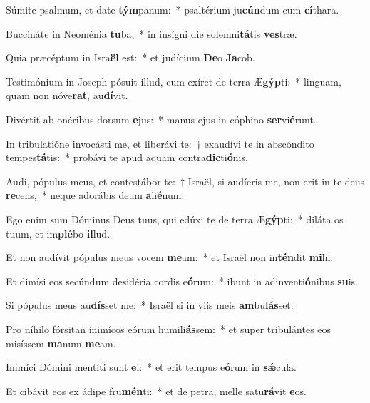 \item Súmite psalmum, et date \textbf{tým}panum:~* psaltérium ju\textbf{cún}dum cum \textbf{cí}thara.
\item Buccináte in Neoménia \textbf{tu}ba,~* in insígni die solemni\textbf{tá}tis \textbf{ves}træ.
\item Quia præcéptum in Isra\textbf{ël} est:~* et judícium \textbf{De}o \textbf{Ja}cob.
\item Testimónium in Joseph pósuit illud, cum exíret de terra Æ\textbf{gýp}ti:~* linguam, quam non nóve\textbf{rat}, au\textbf{dí}vit.
\item Divértit ab onéribus dorsum \textbf{e}jus:~* manus ejus in cóphino \textbf{ser}vi\textbf{é}runt.
\item In tribulatióne invocásti me, et liberávi te:~† exaudívi te in abscóndito tempes\textbf{tá}tis:~* probávi te apud aquam contra\textbf{dic}ti\textbf{ó}nis.
\item Audi, pópulus meus, et contestábor te:~† Israël, si audíeris me, non erit in te deus \textbf{re}cens,~* neque adorábis deum \textbf{a}li\textbf{é}num.
\item Ego enim sum Dóminus Deus tuus, qui edúxi te de terra Æ\textbf{gýp}ti:~* diláta os tuum, et im\textbf{plé}bo \textbf{il}lud.
\item Et non audívit pópulus meus vocem \textbf{me}am:~* et Israël non in\textbf{tén}dit \textbf{mi}hi.
\item Et dimísi eos secúndum desidéria cordis e\textbf{ó}rum:~* ibunt in adinventi\textbf{ó}nibus \textbf{su}is.
\item Si pópulus meus au\textbf{dís}set me:~* Israël si in viis meis \textbf{am}bu\textbf{lás}set:
\item Pro níhilo fórsitan inimícos eórum humili\textbf{ás}sem:~* et super tribulántes eos misíssem \textbf{ma}num \textbf{me}am.
\item Inimíci Dómini mentíti sunt \textbf{e}i:~* et erit tempus e\textbf{ó}rum in \textbf{sǽ}cula.
\item Et cibávit eos ex ádipe fru\textbf{mén}ti:~* et de petra, melle satu\textbf{rá}vit \textbf{e}os.
